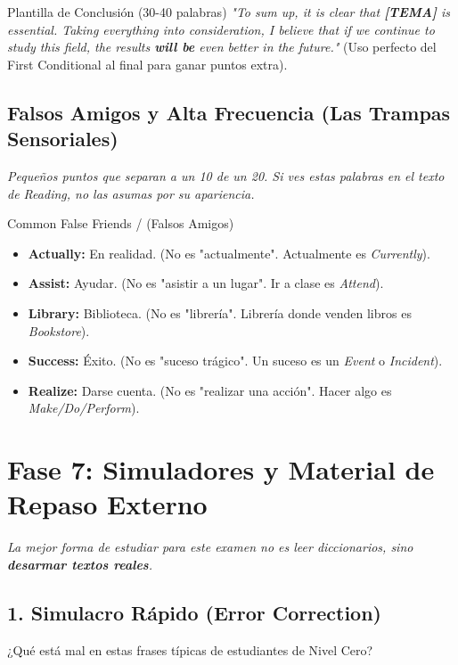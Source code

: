 \documentclass[11pt,a4paper]{article}
\begin{document}
\begin{hackbox}{Plantilla de Conclusión (30-40 palabras)}
    \textit{"To sum up, it is clear that \textbf{[TEMA]} is essential. Taking everything into consideration, I believe that if we continue to study this field, the results \textbf{will be} even better in the future."} (Uso perfecto del First Conditional al final para ganar puntos extra).
\end{hackbox}

\subsection{Falsos Amigos y Alta Frecuencia (Las Trampas Sensoriales)}
\textit{Pequeños puntos que separan a un 10 de un 20. Si ves estas palabras en el texto de Reading, no las asumas por su apariencia.}

\begin{trapbox}{Common False Friends / (Falsos Amigos)}
    \begin{itemize}[noitemsep]
        \item \textbf{Actually:} En realidad. (No es "actualmente". Actualmente es \textit{Currently}).
        \item \textbf{Assist:} Ayudar. (No es "asistir a un lugar". Ir a clase es \textit{Attend}).
        \item \textbf{Library:} Biblioteca. (No es "librería". Librería donde venden libros es \textit{Bookstore}).
        \item \textbf{Success:} Éxito. (No es "suceso trágico". Un suceso es un \textit{Event} o \textit{Incident}).
        \item \textbf{Realize:} Darse cuenta. (No es "realizar una acción". Hacer algo es \textit{Make/Do/Perform}).
    \end{itemize}
\end{trapbox}

\section{Fase 7: Simuladores y Material de Repaso Externo}
\textit{La mejor forma de estudiar para este examen no es leer diccionarios, sino \textbf{desarmar textos reales}.}

\subsection{1. Simulacro Rápido (Error Correction)}
¿Qué está mal en estas frases típicas de estudiantes de Nivel Cero?
\end{document}
